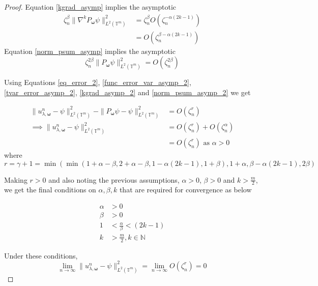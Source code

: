 \documentclass[multixcb]{amstext-l}
\theoremstyle{plain}
\theoremstyle{definition}
\theoremstyle{definition}
\theoremstyle{remark}
\numberwithin{equation}{chapter}
\begin{document}
\begin{proof}
Equation \ref{kgrad_asymp} implies the asymptotic
\begin{equation}\label{kgrad_asymp_2}
    \begin{aligned}
      \zeta^{\beta}_n\|\nabla^kP_{\boldsymbol{\omega}}\psi\|_{L^2(\mathbb{T}^m)}^2 &= \zeta_n^{\beta} O(\zeta_n^{-\alpha(2k-1)})\\
      &= O(\zeta_n^{\beta-\alpha(2k-1)})
      \end{aligned}
\end{equation}
Equation \ref{norm_psum_asymp} implies the asymptotic
\begin{equation}\label{norm_psum_asymp_2}
    \zeta^{2\beta}_n\|P_{\boldsymbol{\omega}}\psi\|_{L^2(\mathbb{T}^m)}^2 = O(\zeta_n^{2\beta})
\end{equation} 

Using Equations \ref{eq_error_2}, \ref{func_error_var_asymp_2}, \ref{tvar_error_asymp_2}, \ref{kgrad_asymp_2} and \ref{norm_psum_asymp_2} we get

\begin{equation}
    \begin{aligned}
      \|u_{\lambda,\boldsymbol{\omega}}^n - \psi\|^2_{L^2(\mathbb{T}^m)}  -    \|P_{\boldsymbol{\omega}}\psi - \psi\|^2_{L^2(\mathbb{T}^m)} &= O(\zeta_n^r)\\
      \implies \|u_{\lambda,\boldsymbol{\omega}}^n - \psi\|^2_{L^2(\mathbb{T}^m)} &= O(\zeta_n^r) + O(\zeta_n^{\alpha})\\
      &= O(\zeta_n^r) \mbox{ as  }\alpha > 0
    \end{aligned}
\end{equation}
 where $$r =  \gamma+1 = \min(\min(1+\alpha-\beta,2+\alpha-\beta,1-\alpha(2k-1), 1+\beta),1+\alpha,\beta-\alpha(2k-1),2\beta) $$
 
 Making $r>0$ and also noting the previous assumptions, $\alpha>0$, $\beta>0$ and $k>\frac{m}{2}$, we get the final conditions on $\alpha,\beta,k$ that are required for convergence as below
 
 \begin{equation}
     \begin{aligned}
     \alpha&>0\\
     \beta&>0\\
      1&<\frac{\alpha}{\beta} <(2k-1)\\
        k&>\frac{m}{2}, k\in \mathbb{N}%
        \end{aligned}
 \end{equation}

 
 Under these conditions, $$\lim\limits_{n\to\infty}\|u_{\lambda,\boldsymbol{\omega}}^n - \psi\|^2_{L^2(\mathbb{T}^m)} = \lim_{n\to\infty}O(\zeta_n^r) = 0$$
 
 \end{proof}
 
\end{document}
